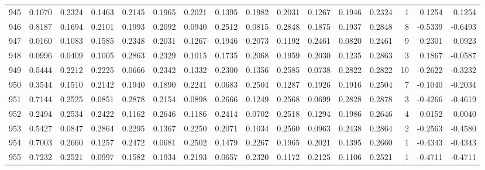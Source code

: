 \begin{tabular}{lrrrrrrrrrrrrrrr}
945 &      0.1070 &  0.2324 &  0.1463 &  0.2145 &  0.1965 &  0.2021 &  0.1395 &  0.1982 &  0.2031 &  0.1267 &   0.1946 &     0.2324 &      1 &                    0.1254 &                     0.1254 \\
946 &      0.8187 &  0.1694 &  0.2101 &  0.1993 &  0.2092 &  0.0940 &  0.2512 &  0.0815 &  0.2848 &  0.1875 &   0.1937 &     0.2848 &      8 &                   -0.5339 &                    -0.6493 \\
947 &      0.0160 &  0.1083 &  0.1585 &  0.2348 &  0.2031 &  0.1267 &  0.1946 &  0.2073 &  0.1192 &  0.2461 &   0.0820 &     0.2461 &      9 &                    0.2301 &                     0.0923 \\
948 &      0.0996 &  0.0409 &  0.1005 &  0.2863 &  0.2329 &  0.1015 &  0.1735 &  0.2068 &  0.1959 &  0.2030 &   0.1235 &     0.2863 &      3 &                    0.1867 &                    -0.0587 \\
949 &      0.5444 &  0.2212 &  0.2225 &  0.0666 &  0.2342 &  0.1332 &  0.2300 &  0.1356 &  0.2585 &  0.0738 &   0.2822 &     0.2822 &     10 &                   -0.2622 &                    -0.3232 \\
950 &      0.3544 &  0.1510 &  0.2142 &  0.1940 &  0.1890 &  0.2241 &  0.0683 &  0.2504 &  0.1287 &  0.1926 &   0.1916 &     0.2504 &      7 &                   -0.1040 &                    -0.2034 \\
951 &      0.7144 &  0.2525 &  0.0851 &  0.2878 &  0.2154 &  0.0898 &  0.2666 &  0.1249 &  0.2568 &  0.0699 &   0.2828 &     0.2878 &      3 &                   -0.4266 &                    -0.4619 \\
952 &      0.2494 &  0.2534 &  0.2422 &  0.1162 &  0.2646 &  0.1186 &  0.2414 &  0.0702 &  0.2518 &  0.1294 &   0.1986 &     0.2646 &      4 &                    0.0152 &                     0.0040 \\
953 &      0.5427 &  0.0847 &  0.2864 &  0.2295 &  0.1367 &  0.2250 &  0.2071 &  0.1034 &  0.2560 &  0.0963 &   0.2438 &     0.2864 &      2 &                   -0.2563 &                    -0.4580 \\
954 &      0.7003 &  0.2660 &  0.1257 &  0.2472 &  0.0681 &  0.2502 &  0.1479 &  0.2267 &  0.1965 &  0.2021 &   0.1395 &     0.2660 &      1 &                   -0.4343 &                    -0.4343 \\
955 &      0.7232 &  0.2521 &  0.0997 &  0.1582 &  0.1934 &  0.2193 &  0.0657 &  0.2320 &  0.1172 &  0.2125 &   0.1106 &     0.2521 &      1 &                   -0.4711 &                    -0.4711 \\

\end{tabular}
